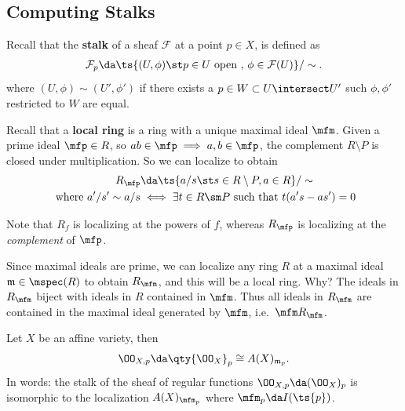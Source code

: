 \hypertarget{computing-stalks}{%
\subsection{Computing Stalks}\label{computing-stalks}}

Recall that the \textbf{stalk} of a sheaf \(\mathcal{F}\) at a point
\(p\in X\), is defined as
\begin{align*}  
\mathcal{F}_p \da \ts{(U, \phi) \st p\in U \text{ open },\, \phi \in \mathcal{F}(U)}/\sim
.\end{align*} where \((U, \phi) \sim (U', \phi')\) if there exists a
\(p\in W \subset U\intersect U'\) such \(\phi, \phi'\) restricted to
\(W\) are equal.

Recall that a \textbf{local ring} is a ring with a unique maximal ideal
\(\mfm\). Given a prime ideal \(\mfp \in R\), so
\(ab\in \mfp \implies a,b\in \mfp\), the complement \(R\setminus P\) is
closed under multiplication. So we can localize to obtain
\begin{align*}
R_\mfp &\da \ts{a/s \st s\in R\setminus P, a\in R}/\sim \\
\text{ where } a'/s' \sim a/s &\iff \exists t\in R\sm P \text{ such that } t(a's - as') = 0
\end{align*}

\begin{warnings}

Note that \(R_f\) is localizing at the powers of \(f\), whereas
\(R_\mfp\) is localizing at the \emph{complement} of \(\mfp\).

\end{warnings}

Since maximal ideals are prime, we can localize any ring \(R\) at a
maximal ideal \(\mathfrak{m} \in \mspec(R)\) to obtain \(R_\mfm\), and
this will be a local ring. Why? The ideals in \(R_\mfm\) biject with
ideals in \(R\) contained in \(\mfm\). Thus all ideals in \(R_\mfm\) are
contained in the maximal ideal generated by \(\mfm\),
i.e.~\(\mfm R_\mfm\).

\begin{lemma}

Let \(X\) be an affine variety, then
\begin{align*}  
\OO_{X, p}\da \qty{\OO_X}_p \cong A(X)_{\mathfrak{m}_p}
.\end{align*} In words: the stalk of the sheaf of regular functions
\(\OO_{X, p} \da (\OO_X)_p\) is isomorphic to the localization
\(A(X)_{\mfm_p}\) where \(\mfm_p \da I(\ts{p})\).

\end{lemma}


